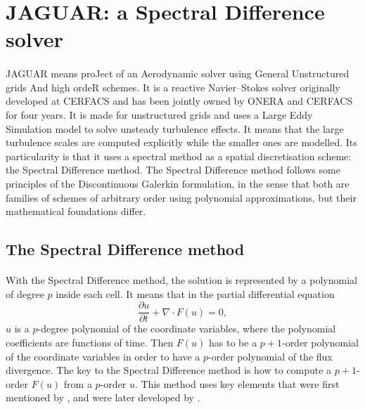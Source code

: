   \section{JAGUAR: a Spectral Difference solver}

    \paragraph{}
    JAGUAR means proJect of an Aerodynamic solver using General Unstructured grids And high ordeR schemes.
    It is a reactive Navier--Stokes solver originally developed at CERFACS and has been jointly owned by ONERA and CERFACS for four years.
    It is made for unstructured grids and uses a Large Eddy Simulation model to solve unsteady turbulence effects.
    It means that the large turbulence scales are computed explicitly while the smaller ones are modelled.
    Its particularity is that it uses a spectral method as a spatial discretisation scheme: the Spectral Difference method.
    The Spectral Difference method follows some principles of the Discontinuous Galerkin formulation, in the sense that both are families of schemes of arbitrary order using polynomial approximations, but their mathematical foundations differ.


    \subsection{The Spectral Difference method}

      \paragraph{}
      With the Spectral Difference method, the solution is represented by a polynomial of degree $p$ inside each cell.
      It means that in the partial differential equation
      \begin{equation}\label{eq:pde_2}
        \frac{\partial u}{\partial t} + \nabla \cdot F\left(u\right) = 0 ,
      \end{equation}
      $u$ is a $p$-degree polynomial of the coordinate variables, where the polynomial coefficients are functions of time.
      Then $F\left(u\right)$ has to be a $p\!+\!1$-order polynomial of the coordinate variables in order to have a $p$-order polynomial of the flux divergence.
      The key to the Spectral Difference method is how to compute a $p + 1$-order $F\left(u\right)$ from a $p$-order $u$.
      This method uses key elements that were first mentioned by \cite{Kopriva1996}, and were later developed by \cite{LiuVinokurWang2006}.

